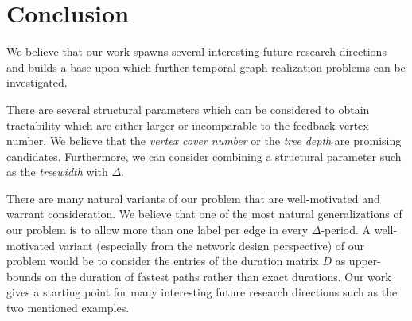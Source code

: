 \documentclass[a4paper,UKenglish,cleveref, autoref, thm-restate,anonymous]{lipics-v2021}
\begin{document}
\section{Conclusion}\label{sec:conclusion}
We believe that our work spawns several interesting future research directions and builds a base upon which further temporal graph realization problems can be investigated.

There are several structural parameters which can be considered to obtain tractability which are either larger or incomparable to the feedback vertex number. We believe that the \emph{vertex cover number} or the \emph{tree depth} are promising candidates.
Furthermore, we can consider combining a structural parameter such as the \emph{treewidth} with $\Delta$.

There are many natural variants of our problem that are well-motivated and warrant consideration. 
We believe that one of the most natural generalizations of our problem is to allow more than one label per edge in every $\Delta$-period. A well-motivated variant (especially from the network design perspective) of our problem would be to consider the entries of the duration matrix $D$ as upper-bounds on the duration of fastest paths rather than exact durations. 
Our work gives a starting point for many interesting future research directions such as the two mentioned examples.



	


\clearpage

\appendix
\end{document}
